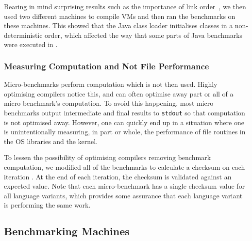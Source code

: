\documentclass[10pt,preprint]{sigplanconf}
\begin{document}
Bearing in mind surprising
results such as the importance of link order~\cite{mytkowicz09surprising}, we
then used two different machines to compile VMs and then ran the benchmarks
on these machines.  This showed that the Java class loader
initialises classes in a non-deterministic order, which affected the way that
some parts of Java benchmarks were executed in  .


\subsubsection{Measuring Computation and Not File Performance}

Micro-benchmarks perform computation which is not then used. Highly optimising
compilers notice this, and can often optimise away part or all of a
micro-benchmark's computation. To avoid this happening, most micro-benchmarks
output intermediate and final results to \texttt{stdout} so that computation is
not optimised away. However, one can quickly end up in a situation where one is
unintentionally measuring, in part or whole, the performance of file routines in
the OS libraries and the kernel.

To lessen the possibility of optimising compilers removing benchmark computation,
we modified all of the benchmarks to calculate a checksum on each iteration
.
At the end of each iteration, the checksum is validated against an expected
value. Note that each micro-benchmark has a single checksum value for all
language variants, which provides some assurance that each language variant is
performing the same work.


\subsection{Benchmarking Machines}
\end{document}
